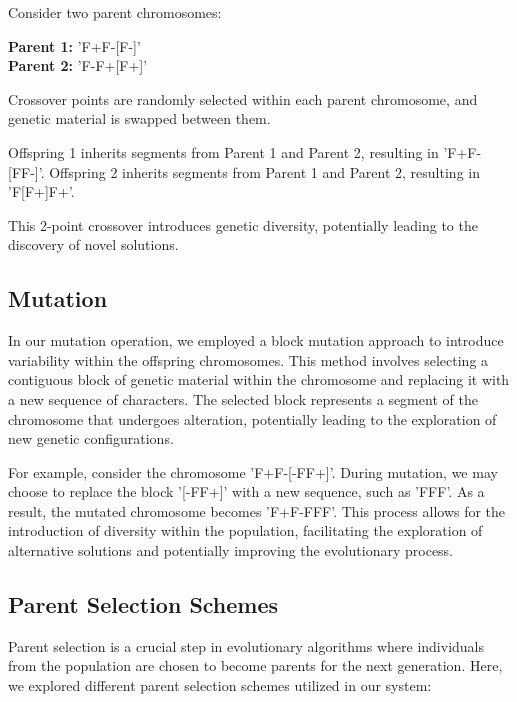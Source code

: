 Consider two parent chromosomes:

\textbf{Parent 1:} 'F+F-[F-]' \\
\textbf{Parent 2:} 'F-F+[F+]'

Crossover points are randomly selected within each parent chromosome, and genetic material is swapped between them. 

Offspring 1 inherits segments from Parent 1 and Parent 2, resulting in 'F+F-[FF-]'. Offspring 2 inherits segments from Parent 1 and Parent 2, resulting in 'F[F+]F+'.

This 2-point crossover introduces genetic diversity, potentially leading to the discovery of novel solutions.

\subsection{Mutation}

In our mutation operation, we employed a block mutation approach to introduce variability within the offspring chromosomes. This method involves selecting a contiguous block of genetic material within the chromosome and replacing it with a new sequence of characters. The selected block represents a segment of the chromosome that undergoes alteration, potentially leading to the exploration of new genetic configurations.

For example, consider the chromosome 'F+F-[-FF+]'. During mutation, we may choose to replace the block '[-FF+]' with a new sequence, such as 'FFF'. As a result, the mutated chromosome becomes 'F+F-FFF'. This process allows for the introduction of diversity within the population, facilitating the exploration of alternative solutions and potentially improving the evolutionary process.

\subsection{Parent Selection Schemes}

Parent selection is a crucial step in evolutionary algorithms where individuals from the population are chosen to become parents for the next generation. Here, we explored different parent selection schemes utilized in our system:

